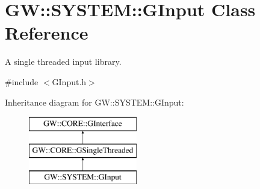 \hypertarget{class_g_w_1_1_s_y_s_t_e_m_1_1_g_input}{}\section{GW\+:\+:S\+Y\+S\+T\+EM\+:\+:G\+Input Class Reference}
\label{class_g_w_1_1_s_y_s_t_e_m_1_1_g_input}


A single threaded input library.  




{\ttfamily \#include $<$G\+Input.\+h$>$}

Inheritance diagram for GW\+:\+:S\+Y\+S\+T\+EM\+:\+:G\+Input\+:\begin{figure}[H]
\begin{center}
\leavevmode
\includegraphics[height=3.000000cm]{class_g_w_1_1_s_y_s_t_e_m_1_1_g_input}
\end{center}
\end{figure}
